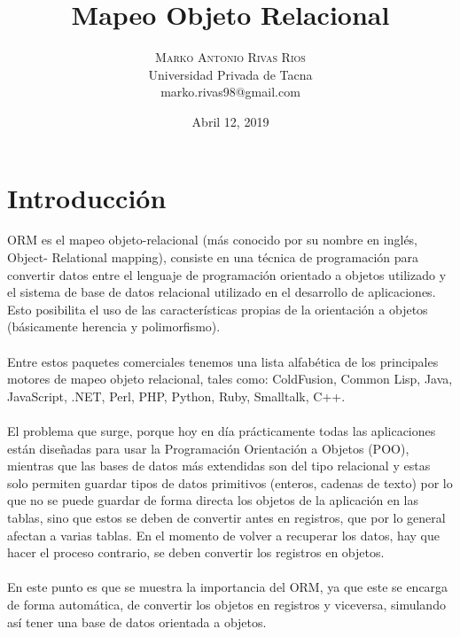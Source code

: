 \documentclass[twoside,twocolumn]{article}
\title{Mapeo Objeto Relacional} %
\author{%
\textsc{Marko Antonio Rivas Rios} \\[1ex] %
\normalsize Universidad Privada de Tacna \\ %
\normalsize {marko.rivas98@gmail.com} %
}
\date{Abril 12, 2019} %
\begin{document}
\maketitle


\section{Introducción}

\lettrine[nindent=0em,lines=3]{O}RM es el mapeo objeto-relacional (más conocido por su nombre en inglés, Object- Relational mapping), consiste en una técnica de programación para convertir datos entre el lenguaje de programación orientado a objetos utilizado y el sistema de base de datos relacional utilizado en el desarrollo de aplicaciones. Esto posibilita el uso de las características propias de la orientación a objetos (básicamente herencia y polimorfismo).\textbf{}\\
\textbf{}\\
Entre estos paquetes comerciales tenemos una lista alfabética de los principales motores de mapeo objeto relacional, tales como: ColdFusion, Common Lisp, Java, JavaScript, .NET, Perl, PHP, Python, Ruby, Smalltalk, C++.\textbf{}\\
\textbf{}\\
El problema que surge, porque hoy en día prácticamente todas las aplicaciones están diseñadas para usar la Programación Orientación a Objetos (POO), mientras que las bases de datos más extendidas son del tipo relacional y estas solo permiten guardar tipos de datos primitivos (enteros, cadenas de texto) por lo que no se puede guardar de forma directa los objetos de la aplicación en las tablas, sino que estos se deben de convertir antes en registros, que por lo general afectan a varias tablas. En el momento de volver a recuperar los datos, hay que hacer el proceso contrario, se deben convertir los registros en objetos. \textbf{}\\
\textbf{}\\
En este punto es que se muestra la importancia del ORM, ya que este se encarga de forma automática, de convertir los objetos en registros y viceversa, simulando así tener una base de datos orientada a objetos.
\end{document}
